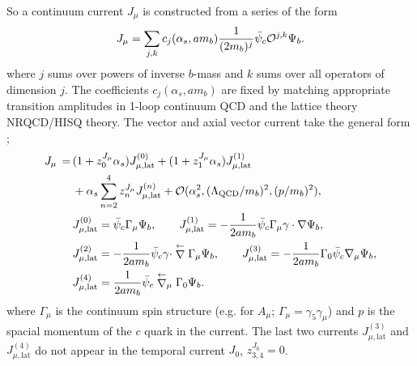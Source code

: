 So a continuum current $J_{\mu}$ is constructed from a series of the form
\begin{align}
  J_{\mu} = \sum_{j,k} c_j(\alpha_s,am_b) {1\over (2m_b)^j} \bar{\psi}_c \mathcal{O}^{j,k} \Psi_b.
\end{align}
where $j$ sums over powers of inverse $b$-mass and $k$ sums over all operators of dimension $j$. The coefficients $c_j(\alpha_s,am_b)$ are fixed by matching appropriate transition amplitudes in 1-loop continuum QCD and the lattice theory NRQCD/HISQ theory. The vector and axial vector current take the general form \cite{PhysRevD.59.094504};
\begin{align}
	J_{\mu} \,=\, & ( 1 + z^{J_{\mu}}_0 \alpha_s ) J_{\mu,\text{lat}}^{(0)} + ( 1 + z^{J_{\mu}}_1 \alpha_s ) J_{\mu,\text{lat}}^{(1)} \nonumber \\ &+ \alpha_s \sum_{n=2}^4 z^{J_{\mu}}_n J_{\mu,\text{lat}}^{(n)} + \mathcal{O}( \alpha_s^2, (\Lambda_{\text{QCD}}/m_b)^2, (p/m_b)^2 ),
	\label{eq:naive}
        \\
        & J_{\mu,\text{lat}}^{(0)} = \bar{\psi}_c \Gamma_{\mu} \Psi_b,
        \quad\quad J_{\mu,\text{lat}}^{(1)} = -{1\over 2am_b} \bar{\psi}_c \Gamma_{\mu} \gamma\cdot \nabla \Psi_b,
        \nonumber
        \\
        & J_{\mu,\text{lat}}^{(2)} = -{1\over 2am_b} \bar{\psi}_c \gamma\cdot \stackrel{\leftarrow}{\nabla} \Gamma_{\mu} \Psi_b,
        \nonumber
        \quad\quad J_{\mu,\text{lat}}^{(3)} = -{1\over 2am_b} \Gamma_0 \bar{\psi}_c \nabla_{\mu} \Psi_b,
        \nonumber
        \\
        & J_{\mu,\text{lat}}^{(4)} = {1\over 2am_b} \bar{\psi}_c \stackrel{\leftarrow}{\nabla}_{\mu} \Gamma_0 \Psi_b.
        \nonumber
\end{align}
where $\Gamma_{\mu}$ is the continuum spin structure (e.g. for $A_{\mu}$; $\Gamma_{\mu}=\gamma_5\gamma_{\mu}$) and $p$ is the spacial momentum of the $c$ quark in the current. The last two currents $J^{(3)}_{\mu,\text{lat}}$ and $J^{(4)}_{\mu,\text{lat}}$ do not appear in the temporal current $J_0$, $z_{3,4}^{J_0} = 0$.

